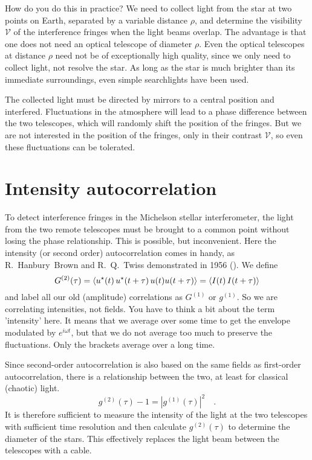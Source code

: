 How do you do this in practice? We need to collect light from the star at two points on Earth, separated by a variable distance $\rho$, and determine the visibility $\mathcal{V}$ of the interference fringes when the light beams overlap. The advantage is that one does not need an optical telescope of diameter $\rho$. Even the optical telescopes at distance $\rho$ need not be of exceptionally high quality, since we only need to collect light, not resolve the star. As long as the star is much brighter than its immediate surroundings, even simple searchlights have been used.

The collected light must be directed by mirrors to a central position and interfered. Fluctuations in the atmosphere will lead to a phase difference between the two telescopes, which will randomly shift the position of the fringes. But we are not interested in the position of the fringes, only in their contrast $\mathcal{V}$, so even these fluctuations can be tolerated.


\section{Intensity autocorrelation}

To detect interference fringes in the Michelson stellar interferometer, the light from the two remote telescopes must be brought to a common point without losing the phase relationship. This is possible, but inconvenient. Here the intensity (or second order)
autocorrelation comes in handy, as R.~Hanbury~Brown and R.~Q.~Twiss demonstrated in 1956 (\cite{HanburyBrown1956}). We define
\begin{equation}
    G^{(2)}(\tau) = \braket{u^\star(t) \,  u^\star(t+\tau) \,  u( t) u( t + \tau)} 
    =  \braket{I(t) \,  I(t+\tau) } 
\end{equation}
and label all our old (amplitude) correlations as $G^{(1)}$ or $g^{(1)}$. So we are correlating intensities, not fields. You have to think a bit about the term 'intensity' here. It means that we average over some time to get the envelope modulated by $e^{i \omega t}$, but that we do not average too much to preserve the fluctuations. Only the brackets average over a long time.

Since second-order autocorrelation is also based on the same fields as first-order autocorrelation, there is a relationship between the two, at least for classical (chaotic) light.
\begin{equation}
    g^{(2)}(\tau) - 1 = \left|  g^{(1)}(\tau) \right|^2  \quad .
\end{equation}
It is therefore sufficient to measure the intensity of the light at the two telescopes with sufficient time resolution and then calculate $ g^{(2)}(\tau) $ to determine the diameter of the stars. This effectively replaces the light beam between the telescopes with a cable.



\printbibliography[segment=\therefsegment,heading=subbibliography]
